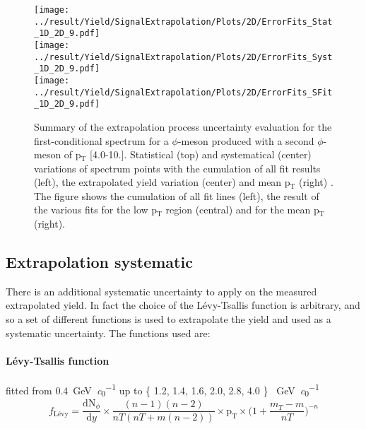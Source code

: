 \begin{figure}
\centering
\texttt{[image: ../result/Yield/SignalExtrapolation/Plots/2D/ErrorFits\_Stat\_1D\_2D\_9.pdf]}\\
\texttt{[image: ../result/Yield/SignalExtrapolation/Plots/2D/ErrorFits\_Syst\_1D\_2D\_9.pdf]}\\
\texttt{[image: ../result/Yield/SignalExtrapolation/Plots/2D/ErrorFits\_SFit\_1D\_2D\_9.pdf]}
\label{fig:Extrap2D_9}
\caption{Summary of the extrapolation process uncertainty evaluation for the first-conditional spectrum for a $\phi$-meson produced with a second $\phi$-meson of p$_{\text{T}}$ [4.0-10.]. Statistical (top) and systematical (center) variations of spectrum points with the cumulation of all fit results (left), the extrapolated yield variation (center) and mean p$_{\text{T}}$ (right) . The figure shows the cumulation of all fit lines (left), the result of the various fits for the low p$_{\text{T}}$ region (central) and for the mean p$_{\text{T}}$ (right).}
\end{figure}

\begin{figure}
\centering
\label{fig:Extrap2D_Full}
\caption{}
\end{figure}

\subsection{Extrapolation systematic}
There is an additional systematic uncertainty to apply on the measured extrapolated yield. In fact the choice of the L\'evy-Tsallis function is arbitrary, and so a set of different functions is used to extrapolate the yield and used as a systematic uncertainty.
The functions used are:

\paragraph{L\'evy-Tsallis function} fitted from \SI{0.4}{\giga\electronvolt\per\clight} up to \{ 1.2, 1.4, 1.6, 2.0, 2.8, 4.0 \} \SI{}{\giga\electronvolt\per\clight}
\begin{equation}
f_{\text{L\'evy}} = \frac{\text{dN}_{\phi}}{\text{d}y}\times\frac{(n-1)(n-2)}{nT(nT+m(n-2))}\times\text{p}_{\text{T}}\times\Big( 1+ \frac{m_{T} -m}{nT} \Big)^{-n}
\label{eq:levy-tsallis}
\end{equation}

